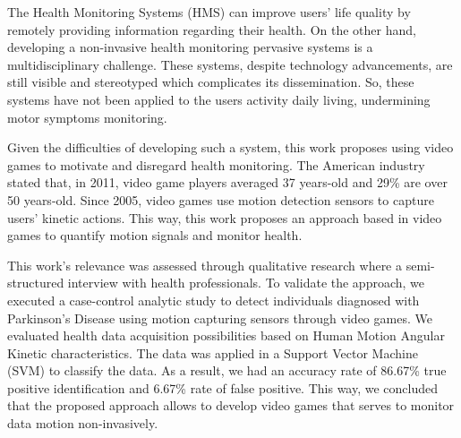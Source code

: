 
The  Health Monitoring Systems (HMS) can improve users' life quality by remotely providing information regarding their health. On the other hand, developing a non-invasive health monitoring pervasive systems is a multidisciplinary challenge. These systems, despite technology advancements, are still visible and stereotyped which complicates its dissemination. So, these systems have not been applied to the users activity daily living, undermining motor symptoms monitoring.

Given the difficulties of developing such a system, this work proposes using video games to motivate and disregard health monitoring. The American industry stated that, in 2011, video game players averaged 37 years-old and 29\% are over 50 years-old. Since 2005, video games use motion detection sensors to capture users' kinetic actions. This way, this work proposes an approach based in video games to quantify motion signals and monitor health.

This work's relevance was assessed through qualitative research where a semi-structured interview with health professionals. To validate the approach, we executed a case-control analytic study to detect individuals diagnosed with Parkinson's Disease using motion capturing sensors through video games. We evaluated health data acquisition possibilities based on Human Motion Angular Kinetic characteristics. The data was applied in a Support Vector Machine (SVM) to classify the data. As a result, we had an accuracy rate of 86.67\% true positive identification and 6.67\% rate of false positive. This way, we concluded that the proposed approach allows to develop video games that serves to monitor data motion non-invasively.